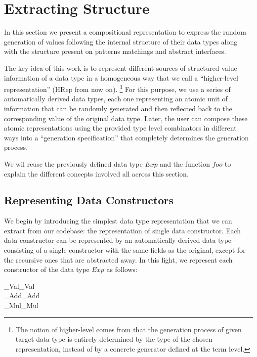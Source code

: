 \documentclass[conference, fleqn]{IEEEtran}
\newcommand{\Conid}[1]{\mathit{#1}}
\newcommand{\Varid}[1]{\mathit{#1}}
\def\resethooks{%
  \global\let\SaveRestoreHook\empty
  \global\let\ColumnHook\empty}
\let\hspre\empty
\let\hspost\empty
\begin{document}
\section{Extracting Structure} \label{sec:hrep}

In this section we present a compositional representation to express the random
generation of values following the internal structure of their data types along
with the structure present on patterns matchings and abstract interfaces.


The key idea of this work is to represent different sources of structured value
information of a data type in a homogeneous way that we call a ``higher-level
representation'' (\ensuremath{\text{HRep}} from now on).%
\footnote{The notion of higher-level comes from that the generation process of
  given target data type is entirely determined by the type of the chosen
  representation, instead of by a concrete generator defined at the term level.}
%
For this purpose, we use a series of automatically derived data types, each one
representing an atomic unit of information that can be randomly generated and
then reflected back to the corresponding value of the original data type.
%
Later, the user can compose these atomic representations using the provided type
level combinators in different ways into a ``generation specification'' that
completely determines the generation process.


We wil reuse the previously defined data type \ensuremath{\Conid{Exp}} and the function \ensuremath{\Varid{foo}} to
explain the different concepts involved all across this section.


\subsection*{\textbf{Representing Data Constructors}}

We begin by introducing the simplest data type representation that we can
extract from our codebase: the representation of single data constructor.
%
Each data constructor can be represented by an automatically derived data type
consisting of a single constructor with the same fields as the original, except
for the recursive ones that are abstracted away.
%
In this light, we represent each constructor of the data type \ensuremath{\Conid{Exp}} as follows:

\begin{hscode}\SaveRestoreHook
\column{B}{@{}>{\hspre}l<{\hspost}@{}}%
\column{16}{@{}>{\hspre}l<{\hspost}@{}}%
\column{E}{@{}>{\hspre}l<{\hspost}@{}}%
\>[B]{}_{Val}\;{}\<[16]%
\>[16]{}\Varid{r}_{Val}\;\Conid{Int}{}\<[E]%
\\
\>[B]{}_{Add}\;{}\<[16]%
\>[16]{}\Varid{r}_{Add}\;\Varid{r}\;\Varid{r}{}\<[E]%
\\
\>[B]{}_{Mul}\;{}\<[16]%
\>[16]{}\Varid{r}_{Mul}\;\Varid{r}\;\Varid{r}{}\<[E]%
\ColumnHook
\end{hscode}\resethooks
\end{document}
